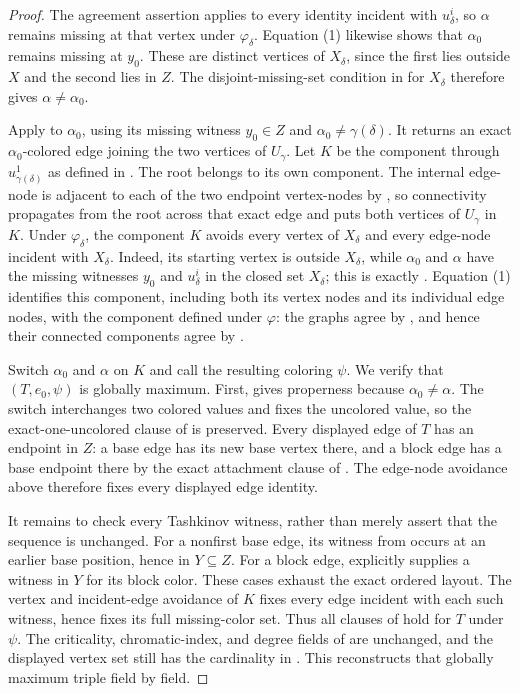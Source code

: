 \begin{proof}
The agreement assertion  applies to
every identity incident with $u^i_\delta$, so $\alpha$ remains missing at
that vertex under $\varphi_\delta$.  Equation (1) likewise shows that
$\alpha_0$ remains missing at $y_0$.  These are distinct vertices of
$X_\delta$, since the first lies outside $X$ and the second lies in $Z$.
The disjoint-missing-set condition in
 for $X_\delta$ therefore gives
$\alpha\ne\alpha_0$.

Apply  to $\alpha_0$, using its
missing witness $y_0\in Z$ and
$\alpha_0\ne\gamma(\delta)$.  It returns an exact $\alpha_0$-colored edge
joining the two vertices of $U_\gamma$.  Let $K$ be the component through
$u^1_{\gamma(\delta)}$ as defined in .  The root
belongs to its own component.  The internal edge-node is adjacent to each
of the two endpoint vertex-nodes by
, so connectivity propagates from the root
across that exact edge and puts both vertices of $U_\gamma$ in $K$.  Under
$\varphi_\delta$, the component $K$ avoids
every vertex of $X_\delta$ and every edge-node incident with $X_\delta$.
Indeed, its starting vertex is outside $X_\delta$, while $\alpha_0$ and
$\alpha$ have the missing witnesses $y_0$ and $u^i_\delta$ in the closed set
$X_\delta$; this is exactly
.  Equation (1) identifies
this component, including both its vertex nodes and its individual edge
nodes, with the component defined under $\varphi$: the graphs agree by
, and hence their connected components
agree by .

Switch $\alpha_0$ and $\alpha$ on $K$ and call the resulting coloring
$\psi$.  We verify that $(T,e_0,\psi)$ is globally maximum.  First,
 gives properness because
$\alpha_0\ne\alpha$.  The switch interchanges two colored values and fixes
the uncolored value, so the exact-one-uncolored clause of
 is preserved.  Every displayed edge of $T$ has an
endpoint in $Z$: a base edge has its new base vertex there, and a block edge
has a base endpoint there by the exact attachment clause of
.  The edge-node avoidance above
therefore fixes every displayed edge identity.

It remains to check every Tashkinov witness, rather than merely assert that
the sequence is unchanged.  For a nonfirst base edge, its witness from
 occurs at an earlier base position, hence in
$Y\subseteq Z$.  For a block edge,
 explicitly supplies a witness in
$Y$ for its block color.  These cases exhaust the exact ordered layout.
The vertex and incident-edge avoidance of $K$ fixes every edge incident with
each such witness, hence fixes its full missing-color set.  Thus all clauses
of  hold for $T$ under $\psi$.  The criticality,
chromatic-index, and degree fields of  are unchanged, and
the displayed vertex set still has the cardinality in
.  This reconstructs that globally maximum
triple field by field.


\end{proof}

